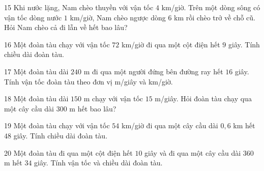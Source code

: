 \gap
\begin{probbox}{15}{\relax}
Khi nước lặng, Nam chèo thuyền với vận tốc $4$ km/giờ. Trên một dòng sông có vận tốc dòng nước $1$ km/giờ, Nam chèo ngược dòng $6$ km rồi chèo trở về chỗ cũ. Hỏi Nam chèo cả đi lẫn về hết bao lâu?
\end{probbox}
\gap
\begin{probbox}{16}{\relax}
Một đoàn tàu chạy với vận tốc $72$ km/giờ đi qua một cột điện hết $9$ giây. Tính chiều dài đoàn tàu.
\end{probbox}
\gap
\begin{probbox}{17}{\relax}
Một đoàn tàu dài $240$ m đi qua một người đứng bên đường ray hết $16$ giây. Tính vận tốc đoàn tàu theo đơn vị m/giây và km/giờ.
\end{probbox}
\gap
\begin{probbox}{18}{\relax}
Một đoàn tàu dài $150$ m chạy với vận tốc $15$ m/giây. Hỏi đoàn tàu chạy qua một cây cầu dài $300$ m hết bao lâu?
\end{probbox}
\gap
\begin{probbox}{19}{\relax}
Một đoàn tàu chạy với vận tốc $54$ km/giờ đi qua một cây cầu dài $0{,}6$ km hết $48$ giây. Tính chiều dài đoàn tàu.
\end{probbox}
\gap
\begin{probbox}{20}{\relax}
Một đoàn tàu đi qua một cột điện hết $10$ giây và đi qua một cây cầu dài $360$ m hết $34$ giây. Tính vận tốc và chiều dài đoàn tàu.
\end{probbox}
